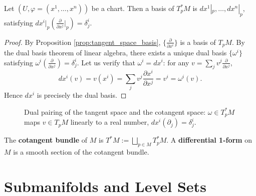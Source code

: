 \begin{proposition}\label{prop:cotangent_basis}
Let $(U, \varphi = (x^1, \dots, x^n))$ be a chart. Then a basis of $T_p^*M$ is $dx^1|_p, \dots, dx^n|_p$, satisfying $dx^i|_p(\frac{\partial}{\partial x^j}|_p) = \delta_j^i$.
\end{proposition}

\begin{proof}
By Proposition \ref{prop:tangent_space_basis}, $\{\frac{\partial}{\partial x^i}\}$ is a basis of $T_pM$. By the dual basis theorem of linear algebra, there exists a unique dual basis $\{\omega^i\}$ satisfying $\omega^i(\frac{\partial}{\partial x^j}) = \delta_j^i$. Let us verify that $\omega^i = dx^i$: for any $v = \sum_j v^j \frac{\partial}{\partial x^j}$,
\[
dx^i(v) = v(x^i) = \sum_j v^j \frac{\partial x^i}{\partial x^j} = v^i = \omega^i(v).
\]
Hence $dx^i$ is precisely the dual basis.
\end{proof}

\begin{figure}[htbp]
\centering
{}
\caption{Dual pairing of the tangent space and the cotangent space: $\omega\in T_p^*M$ maps $v\in T_pM$ linearly to a real number, $dx^i(\partial_j)=\delta^i_j$.}
\label{fig:cotangent_pairing}
\end{figure}

\begin{definition}\label{def:cotangent_bundle}
The \textbf{cotangent bundle} of $M$ is $T^*M := \bigsqcup_{p \in M} T_p^*M$. A \textbf{differential 1-form} on $M$ is a smooth section of the cotangent bundle.
\end{definition}

\section{Submanifolds and Level Sets}

